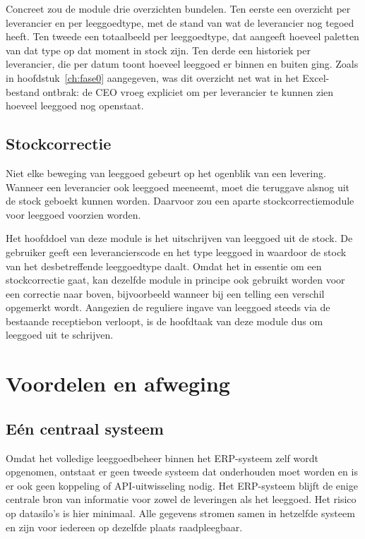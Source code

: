 Concreet zou de module drie overzichten bundelen. Ten eerste een overzicht per leverancier en per leeggoedtype, met de stand van wat de leverancier nog tegoed heeft. Ten tweede een totaalbeeld per leeggoedtype, dat aangeeft hoeveel paletten van dat type op dat moment in stock zijn. Ten derde een historiek per leverancier, die per datum toont hoeveel leeggoed er binnen en buiten ging. Zoals in hoofdstuk~\ref{ch:fase0} aangegeven, was dit overzicht net wat in het Excel-bestand ontbrak: de CEO vroeg expliciet om per leverancier te kunnen zien hoeveel leeggoed nog openstaat.

\subsection{Stockcorrectie}

Niet elke beweging van leeggoed gebeurt op het ogenblik van een levering. Wanneer een leverancier ook leeggoed meeneemt, moet die teruggave alsnog uit de stock geboekt kunnen worden. Daarvoor zou een aparte stockcorrectiemodule voor leeggoed voorzien worden.

Het hoofddoel van deze module is het uitschrijven van leeggoed uit de stock. De gebruiker geeft een leverancierscode en het type leeggoed in waardoor de stock van het desbetreffende leeggoedtype daalt. Omdat het in essentie om een stockcorrectie gaat, kan dezelfde module in principe ook gebruikt worden voor een correctie naar boven, bijvoorbeeld wanneer bij een telling een verschil opgemerkt wordt. Aangezien de reguliere ingave van leeggoed steeds via de bestaande receptiebon verloopt, is de hoofdtaak van deze module dus om leeggoed uit te schrijven.

\section{Voordelen en afweging}

\subsection{Eén centraal systeem}

Omdat het volledige leeggoedbeheer binnen het ERP-systeem zelf wordt opgenomen, ontstaat er geen tweede systeem dat onderhouden moet worden en is er ook geen koppeling of API-uitwisseling nodig. Het ERP-systeem blijft de enige centrale bron van informatie voor zowel de leveringen als het leeggoed. Het risico op datasilo's is hier minimaal. Alle gegevens stromen samen in hetzelfde systeem en zijn voor iedereen op dezelfde plaats raadpleegbaar.

